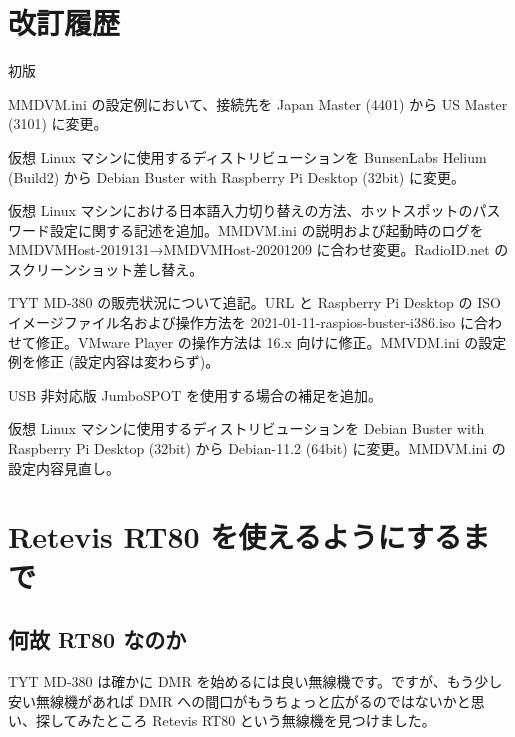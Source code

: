 \documentclass[a4j,oneside]{ujbook}
\begin{document}
\chapter{改訂履歴}
\begin{description}[style=nextline]
 \item[20190822] 初版
 \item[20200222] MMDVM.ini の設定例において、接続先を Japan Master (4401) から US Master (3101) に変更。
 \item[20200223] 仮想 Linux マシンに使用するディストリビューションを BunsenLabs Helium (Build2) から Debian Buster with Raspberry Pi Desktop (32bit) に変更。
 \item[20201213] 仮想 Linux マシンにおける日本語入力切り替えの方法、ホットスポットのパスワード設定に関する記述を追加。MMDVM.ini の説明および起動時のログを MMDVMHost-2019131→MMDVMHost-20201209 に合わせ変更。RadioID.net のスクリーンショット差し替え。
 \item[20210703] TYT MD-380 の販売状況について追記。URL と Raspberry Pi Desktop の ISO イメージファイル名および操作方法を 2021-01-11-raspios-buster-i386.iso に合わせて修正。VMware Player の操作方法は 16.x 向けに修正。MMVDM.ini の設定例を修正 (設定内容は変わらず)。
 \item[20220227] USB 非対応版 JumboSPOT を使用する場合の補足を追加。
 \item[20220320] 仮想 Linux マシンに使用するディストリビューションを Debian Buster with Raspberry Pi Desktop (32bit) から Debian-11.2 (64bit) に変更。MMDVM.ini の設定内容見直し。
\end{description}

\appendix
\chapter{Retevis RT80 を使えるようにするまで}

\section{何故 RT80 なのか}

TYT MD-380 は確かに DMR を始めるには良い無線機です。ですが、もう少し安い無線機があれば DMR への間口がもうちょっと広がるのではないかと思い、探してみたところ Retevis RT80 という無線機を見つけました。
\end{document}
